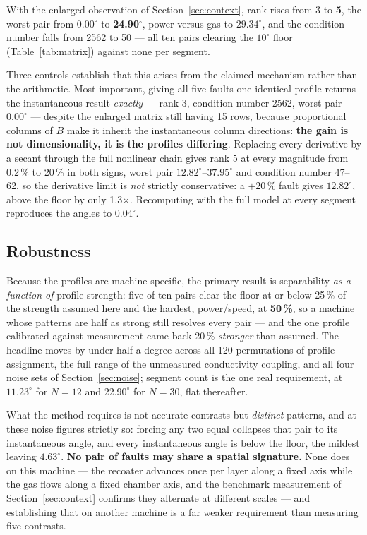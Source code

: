 \documentclass[preprint,times]{elsarticle}
\begin{document}
With the enlarged observation of Section~\ref{sec:context}, rank rises from 3 to
\textbf{5}, the worst pair from $0.00^\circ$ to \textbf{24.90$^\circ$}, power
versus gas to $29.34^\circ$, and the condition number falls from 2562 to 50 ---
all ten pairs clearing the $10^\circ$ floor (Table~\ref{tab:matrix}) against none
per segment.

Three controls establish that this arises from the claimed mechanism rather than
the arithmetic. Most important, giving all five faults one identical profile
returns the instantaneous result \emph{exactly} --- rank 3, condition number 2562,
worst pair $0.00^\circ$ --- despite the enlarged matrix still having 15 rows,
because proportional columns of $B$ make it inherit the instantaneous column
directions: \textbf{the gain is not dimensionality, it is the profiles
differing}. Replacing every derivative by a secant through the full nonlinear
chain gives rank 5 at every magnitude from 0.2\,\% to 20\,\% in both signs, worst
pair $12.82^\circ$--$37.95^\circ$ and condition number 47--62, so the derivative
limit is \emph{not} strictly conservative: a $+20\,\%$ fault gives $12.82^\circ$,
above the floor by only 1.3$\times$. Recomputing with the full model at every
segment reproduces the angles to $0.04^\circ$.

\subsection{Robustness}
\label{sec:robust}

Because the profiles are machine-specific, the primary result is separability
\emph{as a function of} profile strength: five of ten pairs clear the floor at or
below 25\,\% of the strength assumed here and the hardest, power/speed, at
\textbf{50\,\%}, so a machine whose patterns are half as strong still resolves
every pair --- and the one profile calibrated against measurement came back
20\,\% \emph{stronger} than assumed. The headline moves by under half a degree
across all 120 permutations of profile assignment, the full range of the
unmeasured conductivity coupling, and all four noise sets of
Section~\ref{sec:noise}; segment count is the one real requirement, at
$11.23^\circ$ for $N=12$ and $22.90^\circ$ for $N=30$, flat thereafter.

What the method requires is not accurate contrasts but \emph{distinct} patterns,
and at these noise figures strictly so: forcing any two equal collapses that pair
to its instantaneous angle, and every instantaneous angle is below the floor, the
mildest leaving $4.63^\circ$. \textbf{No pair of faults may share a spatial
signature.} None does on this machine --- the recoater advances once per layer
along a fixed axis while the gas flows along a fixed chamber axis, and the
benchmark measurement of Section~\ref{sec:context} confirms they alternate at
different scales --- and establishing that on another machine is a far weaker
requirement than measuring five contrasts.
\end{document}
